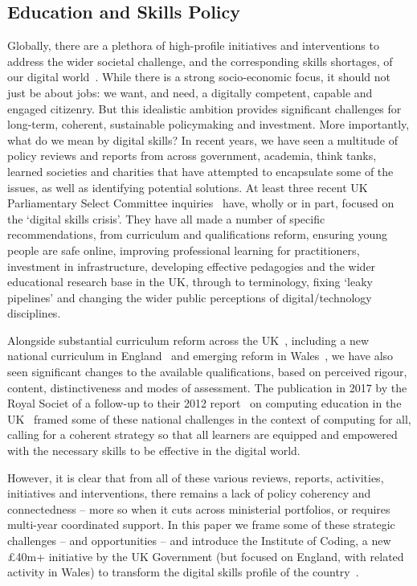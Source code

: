 \documentclass[conference]{IEEEtran}
\begin{document}
\subsection{Education and Skills Policy}

Globally, there are a plethora of high-profile initiatives and
interventions to address the wider societal challenge, and the
corresponding skills shortages, of our digital
world~\cite{cece:2017}. While there is a strong socio-economic focus,
it should not just be about jobs: we want, and need, a digitally
competent, capable and engaged citizenry. But this idealistic ambition
provides significant challenges for long-term, coherent, sustainable
policymaking and investment. More importantly, what do we mean by
digital skills? In recent years, we have seen a multitude of policy
reviews and reports from across government, academia, think tanks,
learned societies and charities that have attempted to encapsulate
some of the issues, as well as identifying potential solutions. At
least three recent UK Parliamentary Select Committee
inquiries~\cite{ukholds:2015,ukhocst:2016,ukholc:2017} have, wholly or
in part, focused on the `digital skills crisis'. They have all made a
number of specific recommendations, from curriculum and qualifications
reform, ensuring young people are safe online, improving professional
learning for practitioners, investment in infrastructure, developing
effective pedagogies and the wider educational research base in the
UK, through to terminology, fixing `leaky pipelines' and changing the
wider public perceptions of digital/technology disciplines.

Alongside substantial curriculum reform across the
UK~\cite{crick+sentance:2011,brown-et-al:sigcse2013,brown-et-al:toce2014},
including a new national curriculum in England~\cite{DfE2013a} and
emerging reform in
Wales~\cite{wgictreview:2013,crick+beauchamp:bera2017,moller+crick:jce2018},
we have also seen significant changes to the available qualifications,
based on perceived rigour, content, distinctiveness and modes of
assessment. The publication in 2017 by the Royal Societ of a follow-up
to their 2012 report~\cite{rs:2012} on computing education in the
UK~\cite{rs:2017} framed some of these national challenges in the
context of computing for all, calling for a coherent strategy so that
all learners are equipped and empowered with the necessary skills to
be effective in the digital world.

However, it is clear that from all of these various reviews, reports,
activities, initiatives and interventions, there remains a lack of
policy coherency and connectedness -- more so when it cuts across
ministerial portfolios, or requires multi-year coordinated support. In
this paper we frame some of these strategic challenges -- and
opportunities -- and introduce the Institute of Coding, a new
\pounds40m+ initiative by the UK Government (but focused on England,
with related activity in Wales) to transform the digital skills
profile of the country~\cite{davenport-et-al:cep2019}.
\end{document}
